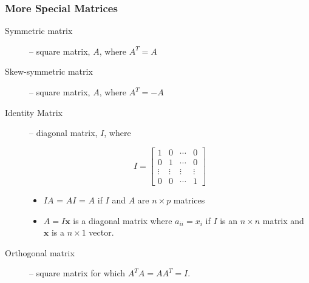\documentclass{beamer}
\newcommand{\Mtx}[1]{\ensuremath{\mathbf{#1}}}
\begin{document}


\begin{frame}
  \frametitle{More Special Matrices}

\begin{description}

\item[Symmetric matrix] -- square matrix, $A$, where $A^T = A$

\item[Skew-symmetric matrix] -- square matrix, $A$, where $A^T = -A$

\item[Identity Matrix] -- diagonal matrix, $I$, where

\[
I = \left[ \begin{array}{cccc}

1 & 0 & \cdots & 0 \\
0 & 1 & \cdots & 0 \\
\vdots & \vdots & \vdots & \vdots \\
0 & 0 & \cdots & 1
\end{array}
\right]
\]

\begin{itemize}
 \item $IA$ = $AI$ = $A$ if $I$ and $A$ are  $n \times p$ matrices
 \item $A = I\Mtx{x}$ is a diagonal matrix where $a_{ii} = x_i$ if $I$ is an $n \times n$ matrix and \Mtx{x} is a $n \times 1$ vector.

\end{itemize}

\item[Orthogonal matrix] -- square matrix for which $A^T A = A A^T = I$.

\end{description}

\end{frame}
\end{document}
